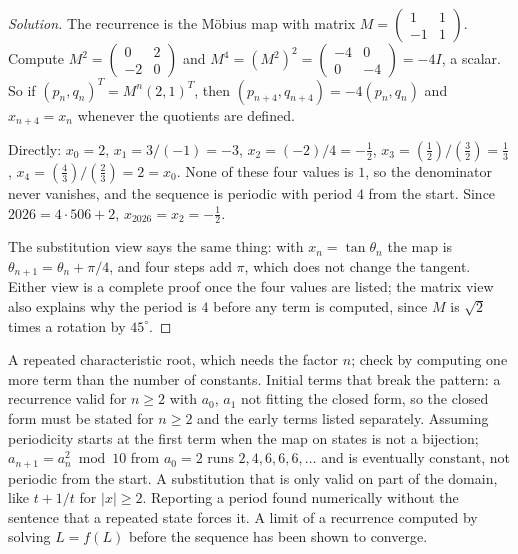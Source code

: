 \begin{proof}[Solution]
The recurrence is the Möbius map with matrix $M=\begin{pmatrix}1&1\\-1&1\end{pmatrix}$. Compute $M^2=\begin{pmatrix}0&2\\-2&0\end{pmatrix}$ and $M^4=(M^2)^2=\begin{pmatrix}-4&0\\0&-4\end{pmatrix}=-4I$, a scalar. So if $(p_n,q_n)^T=M^n(2,1)^T$, then $(p_{n+4},q_{n+4})=-4(p_n,q_n)$ and $x_{n+4}=x_n$ whenever the quotients are defined.

Directly: $x_0=2$, $x_1=3/(-1)=-3$, $x_2=(-2)/4=-\tfrac12$, $x_3=(\tfrac12)/(\tfrac32)=\tfrac13$, $x_4=(\tfrac43)/(\tfrac23)=2=x_0$. None of these four values is $1$, so the denominator never vanishes, and the sequence is periodic with period $4$ from the start. Since $2026=4\cdot506+2$, $x_{2026}=x_2=-\tfrac12$.

The substitution view says the same thing: with $x_n=\tan\theta_n$ the map is $\theta_{n+1}=\theta_n+\pi/4$, and four steps add $\pi$, which does not change the tangent. Either view is a complete proof once the four values are listed; the matrix view also explains why the period is $4$ before any term is computed, since $M$ is $\sqrt2$ times a rotation by $45^\circ$.
\end{proof}

\begin{trap}
A repeated characteristic root, which needs the factor $n$; check by computing one more term than the number of constants. Initial terms that break the pattern: a recurrence valid for $n\ge 2$ with $a_0$, $a_1$ not fitting the closed form, so the closed form must be stated for $n\ge 2$ and the early terms listed separately. Assuming periodicity starts at the first term when the map on states is not a bijection; $a_{n+1}=a_n^2 \bmod 10$ from $a_0=2$ runs $2,4,6,6,6,\dots$ and is eventually constant, not periodic from the start. A substitution that is only valid on part of the domain, like $t+1/t$ for $|x|\ge 2$. Reporting a period found numerically without the sentence that a repeated state forces it. A limit of a recurrence computed by solving $L=f(L)$ before the sequence has been shown to converge.
\end{trap}

